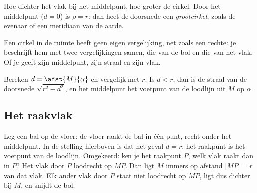Hoe dichter het vlak bij het middelpunt, hoe groter de cirkel. Door het middelpunt ($d = 0$) is $\rho = r$: dan heet de doorsnede een \textit{grootcirkel}, zoals de evenaar of een meridiaan van de aarde.


Een cirkel in de ruimte heeft geen eigen vergelijking, net zoals een rechte: je beschrijft hem met twee vergelijkingen samen, die van de bol en die van het vlak. Of je geeft zijn middelpunt, zijn straal en zijn vlak.

\begin{werkwijze}
Bereken $d = \afst{M}{\alpha}$ en vergelijk met $r$. Is $d < r$, dan is de straal van de doorsnede $\sqrt{r^2 - d^2}$, en het middelpunt het voetpunt van de loodlijn uit $M$ op $\alpha$.
\end{werkwijze}

\begin{oefeningen}
\end{oefeningen}

\subsection{Het raakvlak}

Leg een bal op de vloer: de vloer raakt de bal in één punt, recht onder het middelpunt. In de stelling hierboven is dat het geval $d = r$: het raakpunt is het voetpunt van de loodlijn. Omgekeerd: ken je het raakpunt $P$, welk vlak raakt dan in $P$? Het vlak door $P$ loodrecht op $MP$. Dan ligt $M$ immers op afstand $|MP| = r$ van dat vlak. Elk ander vlak door $P$ staat niet loodrecht op $MP$, ligt dus dichter bij $M$, en snijdt de bol.

